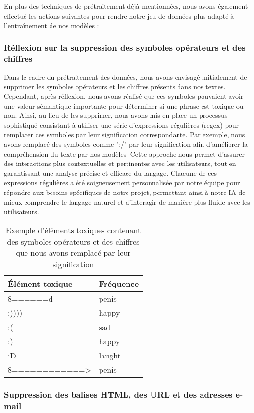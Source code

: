 En plus des techniques de prétraitement déjà mentionnées, nous avons également effectué les actions suivantes pour rendre notre jeu de données plus adapté à l'entraînement de nos modèles :

\subsubsection*{Réflexion sur la suppression des symboles opérateurs et des chiffres}

Dans le cadre du prétraitement des données, nous avons envisagé initialement de supprimer les symboles opérateurs et les chiffres présents dans nos textes. Cependant, après réflexion, nous avons réalisé que ces symboles pouvaient avoir une valeur sémantique importante pour déterminer si une phrase est toxique ou non. Ainsi, au lieu de les supprimer, nous avons mis en place un processus sophistiqué consistant à utiliser une série d'expressions régulières (regex) pour remplacer ces symboles par leur signification correspondante. Par exemple, nous avons remplacé des symboles comme ":/" par leur signification afin d'améliorer la compréhension du texte par nos modèles. Cette approche nous permet d'assurer des interactions plus contextuelles et pertinentes avec les utilisateurs, tout en garantissant une analyse précise et efficace du langage. Chacune de ces expressions régulières a été soigneusement personnalisée par notre équipe pour répondre aux besoins spécifiques de notre projet, permettant ainsi à notre IA de mieux comprendre le langage naturel et d'interagir de manière plus fluide avec les utilisateurs.

\begin{table}[h]
\centering
\begin{tabular}{|l|l|}
\hline
\textbf{Élément toxique} & \textbf{Fréquence} \\ \hline
8======d~~ & penis \\ \hline
:)))) & happy \\ \hline
:( & sad \\ \hline
:) & happy \\ \hline
:D & laught \\ \hline
8============> & penis \\ \hline
\end{tabular}
\caption{Exemple d'éléments toxiques contenant des symboles opérateurs et des chiffres que nous avons remplacé par leur signification}
\end{table}


\subsubsection*{Suppression des balises HTML, des URL et des adresses e-mail}

